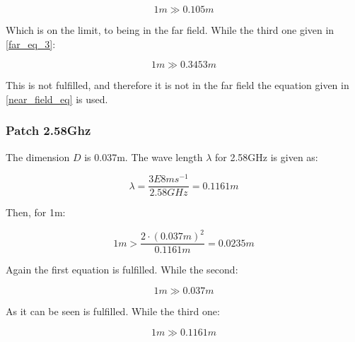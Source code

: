 \begin{equation}
1m \gg 0.105m
\end{equation}

Which is on the limit, to  being in the far field. While the third one given in \ref{far_eq_3}:

\begin{equation}
1m \gg 0.3453m
\end{equation}

This is not fulfilled, and therefore it is not in the far field the equation given in \ref{near_field_eq} is used.


\subsubsection{Patch 2.58Ghz}

The dimension $D$ is 0.037m. The wave length $\lambda$ for 2.58GHz is given as:

\begin{equation}
\lambda = \frac{3E8 ms^{-1}}{2.58 GHz} = 0.1161m
\end{equation}

Then, for 1m:

\begin{equation}
1m > \frac{2 \cdot (0.037m)^{2}}{0.1161m} = 0.0235m
\end{equation} 

Again the first equation is fulfilled. While the second:

\begin{equation}
1m \gg 0.037m
\end{equation}

As it can be seen is fulfilled. While the third one:

\begin{equation}
1m \gg 0.1161m
\end{equation}



 





